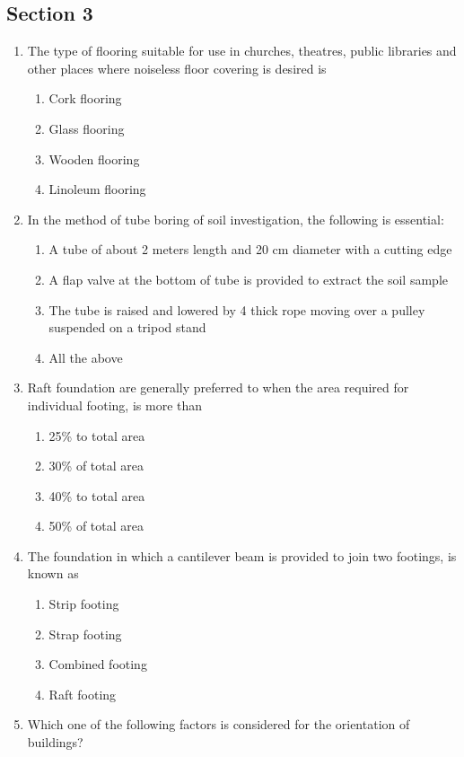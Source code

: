 \documentclass[11pt,a4paper]{article}
\begin{document}
\subsection*{Section 3}
\begin{enumerate}
\item{The type of flooring suitable for use in churches, theatres, public libraries and other places where noiseless floor covering is desired is}
\begin{enumerate}[label=\Alph*.]
\item{Cork flooring}
\item{Glass flooring}
\item{Wooden flooring}
\item{Linoleum flooring}
\end{enumerate}
\item{In the method of tube boring of soil investigation, the following is essential:}
\begin{enumerate}[label=\Alph*.]
\item{A tube of about 2 meters length and 20 cm diameter with a cutting edge}
\item{A flap valve at the bottom of tube is provided to extract the soil sample}
\item{The tube is raised and lowered by 4 thick rope moving over a pulley suspended on a tripod stand}
\item{All the above}
\end{enumerate}
\item{Raft foundation are generally preferred to when the area required for individual footing, is more than}
\begin{enumerate}[label=\Alph*.]
\item{25\% to total area}
\item{30\% of total area}
\item{40\% to total area}
\item{50\% of total area}
\end{enumerate}
\item{The foundation in which a cantilever beam is provided to join two footings, is known as}
\begin{enumerate}[label=\Alph*.]
\item{Strip footing}
\item{Strap footing}
\item{Combined footing}
\item{Raft footing}
\end{enumerate}
\item{Which one of the following factors is considered for the orientation of buildings?}

\end{enumerate}
\end{document}
